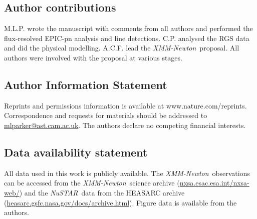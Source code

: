 \documentclass[10pt, a4paper]{article}
\newcommand{\nustar}{\textit{NuSTAR}}
\newcommand{\xmm}{{\it XMM-Newton}}
\begin{document}
\subsection*{Author contributions}
M.L.P. wrote the manuscript with comments from all authors and performed the flux-resolved EPIC-pn analysis and line detections. C.P. analysed the RGS data and did the physical modelling. A.C.F. lead the \xmm\ proposal. All authors were involved with the proposal at various stages.

\subsection*{Author Information Statement}
Reprints and permissions information is available at www.nature.com/reprints. Correspondence and requests for materials should be addressed to \url{mlparker@ast.cam.ac.uk}. The authors declare no competing financial interests.

\subsection*{Data availability statement}
All data used in this work is publicly available. The \xmm\ observations can be accessed from the \xmm\ science archive (\url{nxsa.esac.esa.int/nxsa-web/}) and the \nustar\ data from the HEASARC archive (\url{heasarc.gsfc.nasa.gov/docs/archive.html}). Figure data is available from the authors.
\end{document}
